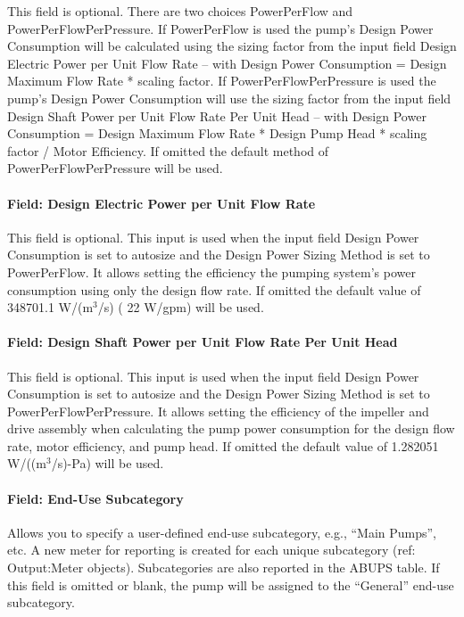 This field is optional. There are two choices PowerPerFlow and PowerPerFlowPerPressure. If PowerPerFlow is used the pump's Design Power Consumption will be calculated using the sizing factor from the input field Design Electric Power per Unit Flow Rate -- with Design Power Consumption = Design Maximum Flow Rate * scaling factor. If PowerPerFlowPerPressure is used the pump's Design Power Consumption will use the sizing factor from the input field Design Shaft Power per Unit Flow Rate Per Unit Head -- with Design Power Consumption = Design Maximum Flow Rate * Design Pump Head * scaling factor / Motor Efficiency. If omitted the default method of PowerPerFlowPerPressure will be used.

\paragraph{Field: Design Electric Power per Unit Flow Rate}\label{field-design-electric-power-per-unit-flow-rate-1}

This field is optional. This input is used when the input field Design Power Consumption is set to autosize and the Design Power Sizing Method is set to PowerPerFlow. It allows setting the efficiency the pumping system's power consumption using only the design flow rate. If omitted the default value of 348701.1 W/(m\(^{3}\)/s) ( 22 W/gpm) will be used.

\paragraph{Field: Design Shaft Power per Unit Flow Rate Per Unit Head}\label{field-design-shaft-power-per-unit-flow-rate-per-unit-head-2}

This field is optional. This input is used when the input field Design Power Consumption is set to autosize and the Design Power Sizing Method is set to PowerPerFlowPerPressure. It allows setting the efficiency of the impeller and drive assembly when calculating the pump power consumption for the design flow rate, motor efficiency, and pump head. If omitted the default value of 1.282051 W/((m\(^{3}\)/s)-Pa) will be used.

\paragraph{Field: End-Use Subcategory}

Allows you to specify a user-defined end-use subcategory, e.g., ``Main Pumps'', etc. A new meter for reporting is created for each unique subcategory (ref: Output:Meter objects). Subcategories are also reported in the ABUPS table. If this field is omitted or blank, the pump will be assigned to the ``General'' end-use subcategory.

